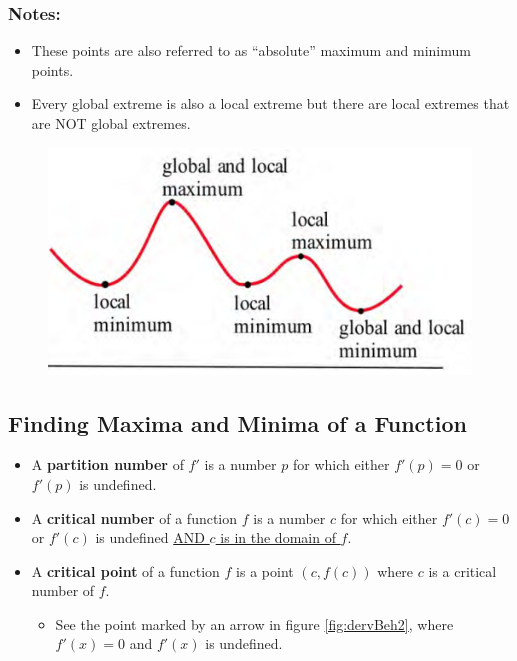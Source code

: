 \subsubsection*{Notes:}
\begin{itemize}
    \item These points are also referred to as “absolute” maximum and minimum points.
    \item Every global extreme is also a local extreme but there are local extremes that are NOT global extremes.
\end{itemize}
\vspace{-0.5cm}
\begin{figure}[h]
    \centering
    \caption{} 
    \includegraphics[scale=0.4]{images/optimization/globalVSlocalExtrema.png} 
    \label{fig:globalVSlocalExtrema}
\end{figure}
\newpage
\subsection*{Finding Maxima and Minima of a Function}
\begin{tcolorbox}[title = {A Partion Number, Critical Number and A Critical Point}]
\begin{itemize}[leftmargin=*]
    \item A \textbf{partition number} of $f'$ is a number $p$ for which either $f'(p)=0$ or $f'(p)$ is undefined.
    \item A \textbf{critical number} of a function $f$ is a number $c$ for which either $f'(c)=0$ or $f'(c)$ is undefined \underline{AND $c$ is in the domain of $f$}.
    \item A \textbf{critical point} of a function $f$ is a point $(c,f(c))$ where $c$ is a critical number of $f$.
    \begin{itemize}
        \item See the point marked by an arrow in figure \ref{fig:dervBeh2}, where $f'(x)=0$ and $f'(x)$ is undefined. 
    \end{itemize}
\end{itemize}
\end{tcolorbox}
\vspace{-0.5cm}
